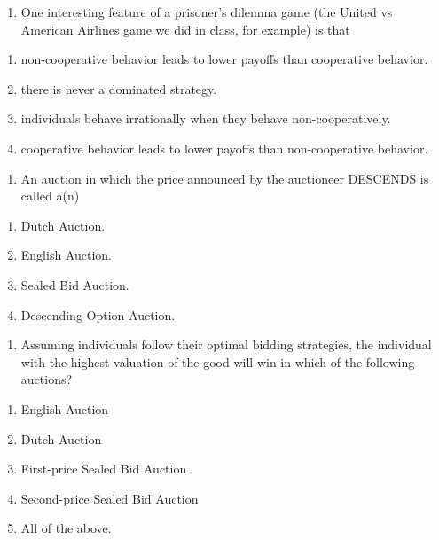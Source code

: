 \documentclass[11pt,]{article}
\providecommand{\tightlist}{%
  \setlength{\itemsep}{0pt}\setlength{\parskip}{0pt}}
\begin{document}
\begin{enumerate}
\def\labelenumi{\arabic{enumi})}
\setcounter{enumi}{17}
\tightlist
\item
  One interesting feature of a prisoner's dilemma game (the United vs
  American Airlines game we did in class, for example) is that
\end{enumerate}

\begin{enumerate}
\def\labelenumi{\Alph{enumi})}
\tightlist
\item
  non-cooperative behavior leads to lower payoffs than cooperative
  behavior.
\item
  there is never a dominated strategy.
\item
  individuals behave irrationally when they behave non-cooperatively.
\item
  cooperative behavior leads to lower payoffs than non-cooperative
  behavior.
\end{enumerate}

\begin{enumerate}
\def\labelenumi{\arabic{enumi})}
\setcounter{enumi}{18}
\tightlist
\item
  An auction in which the price announced by the auctioneer DESCENDS is
  called a(n)
\end{enumerate}

\begin{enumerate}
\def\labelenumi{\Alph{enumi})}
\tightlist
\item
  Dutch Auction.
\item
  English Auction.
\item
  Sealed Bid Auction.
\item
  Descending Option Auction.
\end{enumerate}

\begin{enumerate}
\def\labelenumi{\arabic{enumi})}
\setcounter{enumi}{19}
\tightlist
\item
  Assuming individuals follow their optimal bidding strategies, the
  individual with the highest valuation of the good will win in which of
  the following auctions?
\end{enumerate}

\begin{enumerate}
\def\labelenumi{\Alph{enumi})}
\tightlist
\item
  English Auction
\item
  Dutch Auction
\item
  First-price Sealed Bid Auction
\item
  Second-price Sealed Bid Auction
\item
  All of the above.
\end{enumerate}
\end{document}
